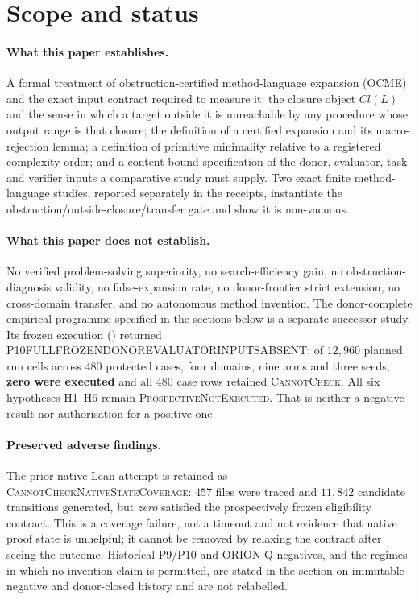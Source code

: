 \section*{Scope and status}

\paragraph{What this paper establishes.}
A formal treatment of obstruction-certified method-language expansion
(OCME) and the exact input contract required to measure it: the closure
object $Cl(L)$ and the sense in which a target outside it is unreachable by
any procedure whose output range is that closure; the definition of a
certified expansion and its macro-rejection lemma; a definition of
primitive minimality relative to a registered complexity order; and a
content-bound specification of the donor, evaluator, task and verifier
inputs a comparative study must supply. Two exact finite method-language
studies, reported separately in the
 receipts, instantiate the
obstruction/outside-closure/transfer gate and show it is non-vacuous.

\paragraph{What this paper does not establish.}
No verified problem-solving superiority, no search-efficiency gain, no
obstruction-diagnosis validity, no false-expansion rate, no donor-frontier
strict extension, no cross-domain transfer, and no autonomous method
invention. The donor-complete empirical programme specified in
the sections below is a separate successor
study. Its frozen execution
() returned
\textsc{P10\codebreak FULL\codebreak FROZEN\codebreak DONOR\codebreak EVALUATOR\codebreak INPUTS\codebreak ABSENT}: of $12{,}960$
planned run cells across $480$ protected cases, four domains, nine arms and
three seeds, \textbf{zero were executed} and all $480$ case rows retained
\textsc{CannotCheck}. All six hypotheses H1--H6 remain
\textsc{Prospective\codebreak Not\codebreak Executed}. That is neither a negative result nor
authorisation for a positive one.

\paragraph{Preserved adverse findings.}
The prior native-Lean attempt is retained as
\textsc{CannotCheck\codebreak Native\codebreak State\codebreak Coverage}: $457$ files were traced and
$11{,}842$ candidate transitions generated, but \emph{zero} satisfied the
prospectively frozen eligibility contract. This is a coverage failure, not
a timeout and not evidence that native proof state is unhelpful; it cannot
be removed by relaxing the contract after seeing the outcome. Historical
P9/P10 and ORION-Q negatives, and the regimes in which no invention claim
is permitted, are stated in the section on immutable negative and donor-closed history and are not
relabelled.

